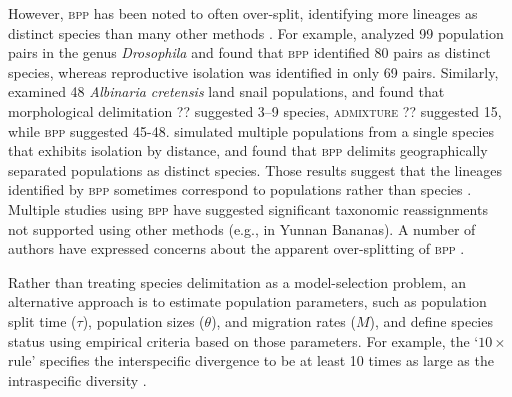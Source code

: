 \documentclass[A4]{article1}
\begin{document}
However, \textsc{bpp} has been noted to often over-split, identifying more lineages as
distinct species than many other methods \citep{Sukumaran2017}.  For example,
\cite{Campillo2020} analyzed 99 population pairs in the genus \textit{Drosophila} and
found that \textsc{bpp} identified 80 pairs as distinct species, whereas reproductive
isolation was identified in only 69 pairs.  Similarly, \citet{Bamberger2022} examined 48
\textit{Albinaria cretensis} land snail populations, and found that morphological
delimitation ?? suggested 3--9 species, \textsc{admixture} ?? suggested 15, while
\textsc{bpp} suggested 45-48. \citet{Barley2018} simulated multiple populations from a
single species that exhibits isolation by distance, and found that \textsc{bpp} delimits
geographically separated populations as distinct species. Those results suggest that the
lineages identified by \textsc{bpp} sometimes correspond to populations rather than
species \citep{Chambers2020}. Multiple studies using \textsc{bpp} have suggested
significant taxonomic reassignments not supported using other methods (e.g.,
\citealp{Wu2018} in Yunnan Bananas).  A number of authors have expressed concerns about
the apparent over-splitting of \textsc{bpp} \citep{MacGuigan2021}.

Rather than treating species delimitation as a model-selection problem, an alternative
approach is to estimate population parameters, such as population split time ($\tau$),
population sizes ($\theta$), and migration rates ($M$), and define species status using
empirical criteria based on those parameters.  For example, the `$10\times$ rule'
specifies the interspecific divergence to be at least 10 times as large as the
intraspecific diversity \citep{Hebert2004}.  
\end{document}

